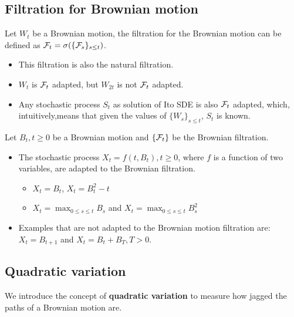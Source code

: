 \begin{refsection}
\subsection{Filtration for Brownian motion}
\begin{definition}
	\cite{shreve2004stochastic2}\cite{Holmes-Cerfon2015applied}Let $W_t$ be a Brownian motion, the filtration for the Brownian motion can be defined as $\mathcal{F}_t=\sigma(\{\mathcal{F}_s\}_{s\leq t})$.
\end{definition}

\begin{remark}\hfill
	\begin{itemize}
		\item This filtration is also the natural filtration.
		\item $W_t$ is $\mathcal{F}_t$ adapted, but $W_{2t}$ is not $\mathcal{F}_t$ adapted.
		\item Any stochastic process $S_t$ as solution  of Ito SDE is also $\mathcal{F}_t$ adapted, which, intuitively,means that given the values of $\{W_s\}_{s\leq t}$, $S_t$ is known.
	\end{itemize}
\end{remark}


\begin{remark}\hfill
	Let $B_t,t\geq 0$ be a Brownian motion and $\{\mathcal{F}_t\}$ be the Brownian filtration. 
	\begin{itemize}
		\item The stochastic process $X_t = f(t,B_t),t\geq 0$, where $f$ is a function of two variables, are adapted to the Brownian filtration.
		\begin{itemize}
			\item $X_t = B_t$, $X_t = B_t^2 - t$
			\item $X_t = \max_{0\leq s \leq t} B_s$ and $X_t = \max_{0\leq s\leq t} B_s^2$
		\end{itemize}
		\item Examples that are not adapted to the Brownian motion filtration are: $X_t = B_{t+1}$ and $X_t = B_t + B_T, T>0$.
	\end{itemize}
\end{remark}


\subsection{Quadratic variation}
\begin{remark}[purpose]
	We introduce the concept of \textbf{quadratic variation} to measure how jagged the paths of a Brownian motion are. 	
\end{remark}


\end{refsection}
